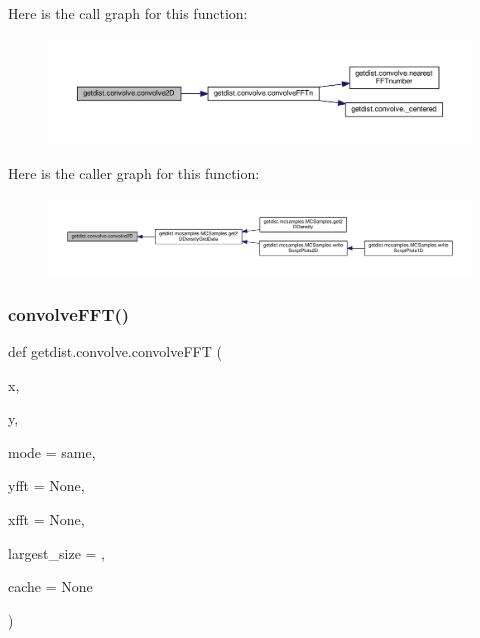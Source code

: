Here is the call graph for this function\+:
\nopagebreak
\begin{figure}[H]
\begin{center}
\leavevmode
\includegraphics[width=350pt]{namespacegetdist_1_1convolve_a519469039fd4ef30511d804e47fe8f41_cgraph}
\end{center}
\end{figure}
Here is the caller graph for this function\+:
\nopagebreak
\begin{figure}[H]
\begin{center}
\leavevmode
\includegraphics[width=350pt]{namespacegetdist_1_1convolve_a519469039fd4ef30511d804e47fe8f41_icgraph}
\end{center}
\end{figure}
\mbox{\label{namespacegetdist_1_1convolve_af08ac2f6f2680fe66589162631d5d9ba}} 
\subsubsection{\texorpdfstring{convolve\+F\+F\+T()}{convolveFFT()}}
{\footnotesize\ttfamily def getdist.\+convolve.\+convolve\+F\+FT (\begin{DoxyParamCaption}\item[{}]{x,  }\item[{}]{y,  }\item[{}]{mode = {\ttfamily \textquotesingle{}same\textquotesingle{}},  }\item[{}]{yfft = {\ttfamily None},  }\item[{}]{xfft = {\ttfamily None},  }\item[{}]{largest\+\_\+size = {},  }\item[{}]{cache = {\ttfamily None} }\end{DoxyParamCaption})}

